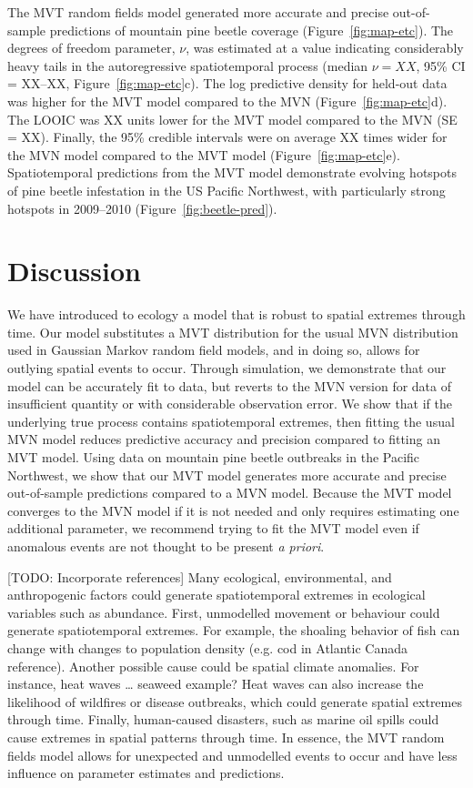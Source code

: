 \documentclass[12pt,english]{article}
\begin{document}
\begin{spacing}{1.9}
The MVT random fields model generated more accurate and precise out-of-sample
predictions of mountain pine beetle coverage (Figure~\ref{fig:map-etc}). The
degrees of freedom parameter, $\nu$, was estimated at a value indicating
considerably heavy tails in the autoregressive spatiotemporal process (median
$\nu = XX$, 95\% CI = XX--XX, Figure~\ref{fig:map-etc}c). The log predictive
density for held-out data was higher for the MVT model compared to the MVN
(Figure~\ref{fig:map-etc}d). The LOOIC was XX units lower for the MVT model
compared to the MVN (SE = XX). Finally, the 95\% credible intervals were on
average XX times wider for the MVN model compared to the MVT model
(Figure~\ref{fig:map-etc}e). Spatiotemporal predictions from the MVT model
demonstrate evolving hotspots of pine beetle infestation in the US Pacific
Northwest, with particularly strong hotspots in 2009--2010
(Figure~\ref{fig:beetle-pred}).

\section{Discussion}

We have introduced to ecology a model that is robust to spatial extremes through
time. Our model substitutes a MVT distribution for the usual MVN distribution
used in Gaussian Markov random field models, and in doing so, allows for
outlying spatial events to occur. Through simulation, we demonstrate that our
model can be accurately fit to data, but reverts to the MVN version for data of
insufficient quantity or with considerable observation error. We show that if
the underlying true process contains spatiotemporal extremes, then fitting the
usual MVN model reduces predictive accuracy and precision compared to fitting an
MVT model. Using data on mountain pine beetle outbreaks in the Pacific
Northwest, we show that our MVT model generates more accurate and precise
out-of-sample predictions compared to a MVN model. Because the MVT model
converges to the MVN model if it is not needed and only requires estimating one
additional parameter, we recommend trying to fit the MVT model even if anomalous
events are not thought to be present \textit{a priori}.

[TODO: Incorporate references] Many ecological, environmental, and anthropogenic
factors could generate spatiotemporal extremes in ecological variables such as
abundance. First, unmodelled movement or behaviour could generate spatiotemporal
extremes. For example, the shoaling behavior of fish can change with changes to
population density (e.g. cod in Atlantic Canada reference). Another possible
cause could be spatial climate anomalies. For instance, heat waves \ldots
seaweed example? Heat waves can also increase the likelihood of wildfires or
disease outbreaks, which could generate spatial extremes through time. Finally,
human-caused disasters, such as marine oil spills could cause extremes in
spatial patterns through time. In essence, the MVT random fields model allows
for unexpected and unmodelled events to occur and have less influence on
parameter estimates and predictions.


\end{spacing}
\end{document}
